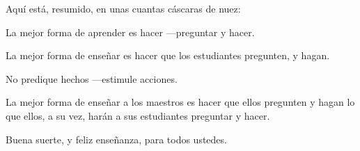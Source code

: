 \documentclass[12pt]{article}
\begin{document}
    Aquí está, resumido, en unas cuantas cáscaras de nuez:

    La mejor forma de aprender es hacer —preguntar y hacer.

    La mejor forma de enseñar es hacer que los estudiantes pregunten, y hagan.

    No predique hechos —estimule acciones.

    La mejor forma de enseñar a los maestros es hacer que ellos pregunten y hagan lo que ellos, a su vez, harán a
    sus estudiantes preguntar y hacer.

    Buena suerte, y feliz enseñanza, para todos ustedes.
\end{document}
